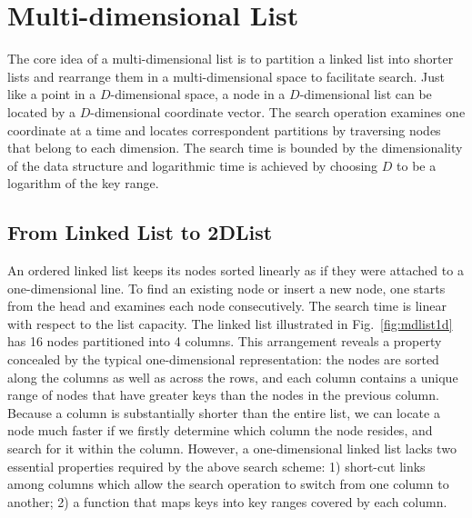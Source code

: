\documentclass[10pt,journal,letter,compsoc]{IEEEtran}
\begin{document}

\section{Multi-dimensional List}
\label{sec:mdlist}
The core idea of a multi-dimensional list is to partition a linked list into shorter lists and rearrange them in a multi-dimensional space to facilitate search.
Just like a point in a $D$-dimensional space, a node in a $D$-dimensional list can be located by a $D$-dimensional coordinate vector.
The search operation examines one coordinate at a time and locates correspondent partitions by traversing nodes that belong to each dimension. 
The search time is bounded by the dimensionality of the data structure and logarithmic time is achieved by choosing $D$ to be a logarithm of the key range. 

\vspace{-0.09in}
\subsection{From Linked List to 2DList}
\label{sec:mdlist-overview}
An ordered linked list keeps its nodes sorted linearly as if they were attached to a one-dimensional line.
To find an existing node or insert a new node, one starts from the head and examines each node consecutively.
The search time is linear with respect to the list capacity.
The linked list illustrated in Fig.~\ref{fig:mdlist1d} has 16 nodes partitioned into 4 columns. 
This arrangement reveals a property concealed by the typical one-dimensional representation: the nodes are sorted along the columns as well as across the rows, and each column contains a unique range of nodes that have greater keys than the nodes in the previous column.
Because a column is substantially shorter than the entire list, we can locate a node much faster if we firstly determine which column the node resides, and search for it within the column. 
However, a one-dimensional linked list lacks two essential properties required by the above search scheme: 1) short-cut links among columns which allow the search operation to switch from one column to another; 2) a function that maps keys into key ranges covered by each column.
\end{document}

